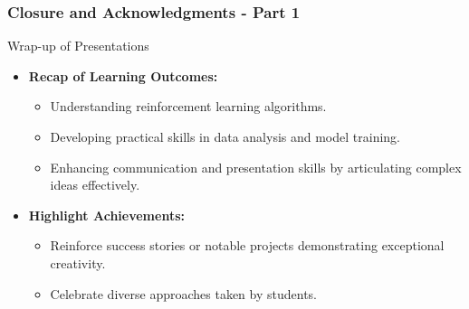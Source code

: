 \documentclass[aspectratio=169]{beamer}
\begin{document}
\begin{frame}[fragile]
    \frametitle{Closure and Acknowledgments - Part 1}
    \begin{block}{Wrap-up of Presentations}
        \begin{itemize}
            \item \textbf{Recap of Learning Outcomes:}
            \begin{itemize}
                \item Understanding reinforcement learning algorithms.
                \item Developing practical skills in data analysis and model training.
                \item Enhancing communication and presentation skills by articulating complex ideas effectively.
            \end{itemize}
            \item \textbf{Highlight Achievements:}
            \begin{itemize}
                \item Reinforce success stories or notable projects demonstrating exceptional creativity.
                \item Celebrate diverse approaches taken by students.
            \end{itemize}
        \end{itemize}
    \end{block}
\end{frame}
\end{document}
